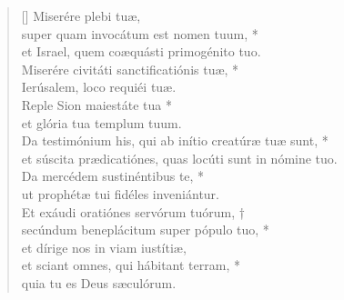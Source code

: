 \begin{verse}[\versewidth]
Miserére plebi tuæ,\\ 
super quam invocátum est nomen tuum, *\\
et Israel, quem coæquásti primogénito tuo.\\
\vin Miserére civitáti sanctificatiónis tuæ, *\\
\vin Ierúsalem, loco requiéi tuæ.\\
Reple Sion maiestáte tua *\\
et glória tua templum tuum.\\
\vin Da testimónium his, 
	qui ab inítio creatúræ tuæ sunt, *\\
\vin et súscita prædicatiónes, 
	quas locúti sunt in nómine tuo.\\
Da mercédem sustinéntibus te, *\\
ut prophétæ tui fidéles inveniántur.\\
\vin Et exáudi oratiónes servórum tuórum, †\\
\vin secúndum beneplácitum super pópulo tuo, *\\
\vin et dírige nos in viam iustítiæ, \\
et sciant omnes, qui hábitant terram, *\\
quia tu es Deus sæculórum.\\

\end{verse}
